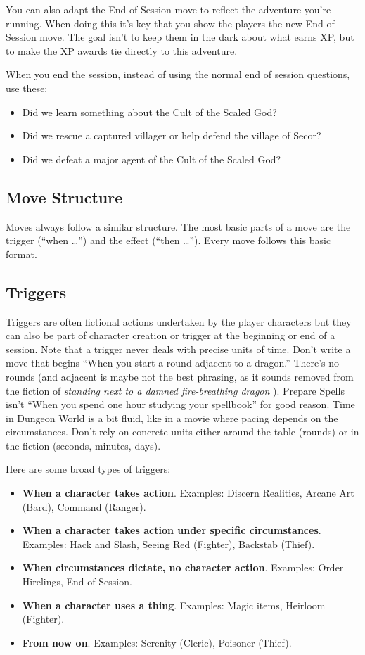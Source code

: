 You can also adapt the End of Session move to reflect the adventure you're running. When doing this it's key that you show the players the new End of Session move. The goal isn't to keep them in the dark about what earns XP, but to make the XP awards tie directly to this adventure.


When you end the session, instead of using the normal end of session questions, use these:
\begin{itemize}
\item Did we learn something about the Cult of the Scaled God?
\item Did we rescue a captured villager or help defend the village of Secor?
\item Did we defeat a major agent of the Cult of the Scaled God?

\end{itemize}
\subsection{Move Structure}


Moves always follow a similar structure. The most basic parts of a move are the trigger (``when \ldots '') and the effect (``then \ldots ''). Every move follows this basic format.
\subsection{Triggers}


Triggers are often fictional actions undertaken by the player characters but they can also be part of character creation or trigger at the beginning or end of a session. Note that a trigger never deals with precise units of time. Don't write a move that begins ``When you start a round adjacent to a dragon.'' There's no rounds (and adjacent is maybe not the best phrasing, as it sounds removed from the fiction of \emph{standing next to a damned fire-breathing dragon}
). Prepare Spells isn't ``When you spend one hour studying your spellbook'' for good reason. Time in Dungeon World is a bit fluid, like in a movie where pacing depends on the circumstances. Don't rely on concrete units either around the table (rounds) or in the fiction (seconds, minutes, days).


Here are some broad types of triggers:
\begin{itemize}
\item \textbf{When a character takes action}. Examples: Discern Realities, Arcane Art (Bard), Command (Ranger).
\item \textbf{When a character takes action under specific circumstances}. Examples: Hack and Slash, Seeing Red (Fighter), Backstab (Thief).
\item \textbf{When circumstances dictate, no character action}. Examples: Order Hirelings, End of Session.
\item \textbf{When a character uses a thing}. Examples: Magic items, Heirloom (Fighter).
\item \textbf{From now on}. Examples: Serenity (Cleric), Poisoner (Thief).

\end{itemize}
